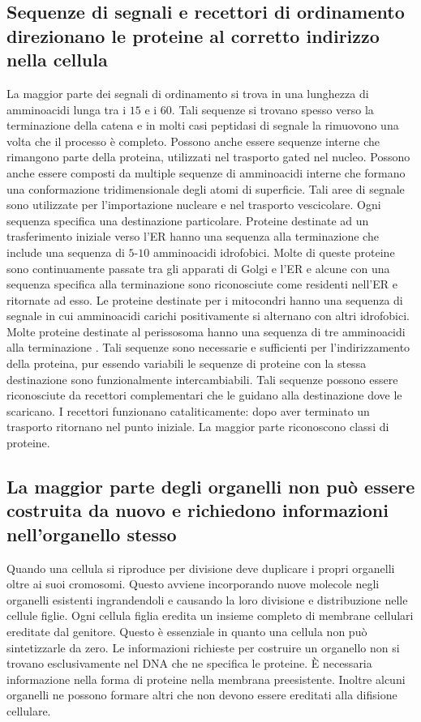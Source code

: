 \subsection{Sequenze di segnali e recettori di ordinamento direzionano le proteine al corretto indirizzo nella cellula}
La maggior parte dei segnali di ordinamento si trova in una lunghezza di amminoacidi lunga tra i $15$ e i $60$. Tali sequenze si trovano spesso verso la terminazione  della catena
e in molti casi peptidasi di segnale la rimuovono una volta che il processo \`e completo. Possono anche essere sequenze interne che rimangono parte della proteina, utilizzati nel 
trasporto gated nel nucleo. Possono anche essere composti da multiple sequenze di amminoacidi interne che formano una conformazione tridimensionale degli atomi di superficie. Tali 
aree di segnale sono utilizzate per l'importazione nucleare e nel trasporto vescicolare. Ogni sequenza specifica una destinazione particolare. Proteine destinate ad un trasferimento 
iniziale verso l'ER hanno una sequenza alla terminazione  che include una sequenza di $5$-$10$ amminoacidi idrofobici. Molte di queste proteine sono continuamente passate tra gli
apparati di Golgi e l'ER e alcune con una sequenza specifica alla terminazione  sono riconosciute come residenti nell'ER e ritornate ad esso. Le proteine destinate per i mitocondri
hanno una sequenza di segnale in cui amminoacidi carichi positivamente si alternano con altri idrofobici. Molte proteine destinate al perissosoma hanno una sequenza di tre amminoacidi
alla terminazione . Tali sequenze sono necessarie e sufficienti per l'indirizzamento della proteina, pur essendo variabili le sequenze di proteine con la stessa destinazione sono
funzionalmente intercambiabili. Tali sequenze possono essere riconosciute da recettori complementari che le guidano alla destinazione dove le scaricano. I recettori funzionano 
cataliticamente: dopo aver terminato un trasporto ritornano nel punto iniziale. La maggior parte riconoscono classi di proteine. 
\subsection{La maggior parte degli organelli non pu\`o essere costruita da nuovo e richiedono informazioni nell'organello stesso}
Quando una cellula si riproduce per divisione deve duplicare i propri organelli oltre ai suoi cromosomi. Questo avviene incorporando nuove molecole negli organelli esistenti 
ingrandendoli e causando la loro divisione e distribuzione nelle cellule figlie. Ogni cellula figlia eredita un insieme completo di membrane cellulari ereditate dal genitore. Questo \`e
essenziale in quanto una cellula non pu\`o sintetizzarle da zero. Le informazioni richieste per costruire un organello non si trovano esclusivamente nel DNA che ne specifica le proteine.
\`E necessaria informazione nella forma di proteine nella membrana preesistente. Inoltre alcuni organelli ne possono formare altri che non devono essere ereditati alla difisione 
cellulare. 
